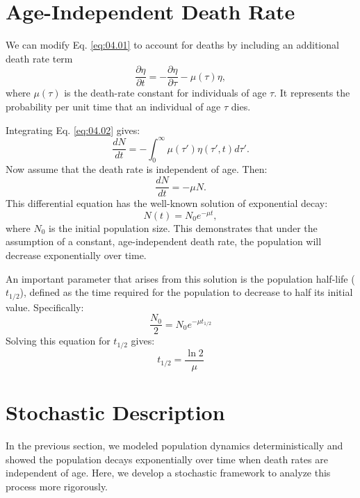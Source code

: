\section{Age-Independent Death Rate}

We can modify Eq. \eqref{eq:04.01} to account for deaths by including an additional death rate term
\begin{equation}
\frac{\partial \eta}{\partial t} = -\frac{\partial \eta}{\partial \tau} - \mu(\tau) \eta, \label{eq:04.02}
\end{equation}
where $\mu(\tau)$ is the death-rate constant for individuals of age $\tau$. It represents the probability per unit time that an individual of age $\tau$ dies.

Integrating Eq. \eqref{eq:04.02} gives:
\begin{equation*}
\frac{dN}{dt} = - \int_0^\infty \mu(\tau') \eta(\tau', t) d\tau'.
\end{equation*}
Now assume that the death rate is independent of age. Then:
\begin{equation}
\frac{dN}{dt} = - \mu N. \label{eq:04.03}
\end{equation}
This differential equation has the well-known solution of exponential decay:
\begin{equation*}
N(t) = N_0 e^{-\mu t},
\end{equation*}
where $N_0$ is the initial population size. This demonstrates that under the assumption of a constant, age-independent death rate, the population will decrease exponentially over time.

An important parameter that arises from this solution is the population half-life ($t_{1/2}$), defined as the time required for the population to decrease to half its initial value. Specifically:
\begin{equation*}
\frac{N_0}{2} = N_0 e^{-\mu t_{1/2}}
\end{equation*}
Solving this equation for $t_{1/2}$ gives:
\begin{equation}
t_{1/2} = \frac{\ln{2}}{\mu} \label{eq:04.04}
\end{equation}

\section{Stochastic Description}

In the previous section, we modeled population dynamics deterministically and showed the population decays exponentially over time when death rates are independent of age. Here, we develop a stochastic framework to analyze this process more rigorously.

